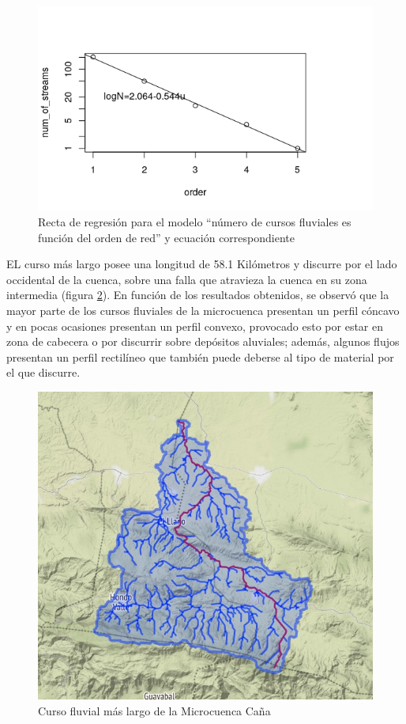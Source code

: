 \documentclass[11pt,]{article}
\begin{document}
\begin{figure}
\centering
\includegraphics{razon_de_bifurcacion.png}
\caption{Recta de regresión para el modelo ``número de cursos fluviales
es función del orden de red'' y ecuación
correspondiente\label{razonbifurcacion}}
\end{figure}

EL curso más largo posee una longitud de 58.1 Kilómetros y discurre por
el lado occidental de la cuenca, sobre una falla que atravieza la cuenca
en su zona intermedia (figura \ref{cursolargo}). En función de los
resultados obtenidos, se observó que la mayor parte de los cursos
fluviales de la microcuenca presentan un perfil cóncavo y en pocas
ocasiones presentan un perfil convexo, provocado esto por estar en zona
de cabecera o por discurrir sobre depósitos aluviales; además, algunos
flujos presentan un perfil rectilíneo que también puede deberse al tipo
de material por el que discurre.

\begin{figure}
\centering
\includegraphics{curso_mas_largo.jpeg}
\caption{Curso fluvial más largo de la Microcuenca
Caña\label{cursolargo}}
\end{figure}
\end{document}
